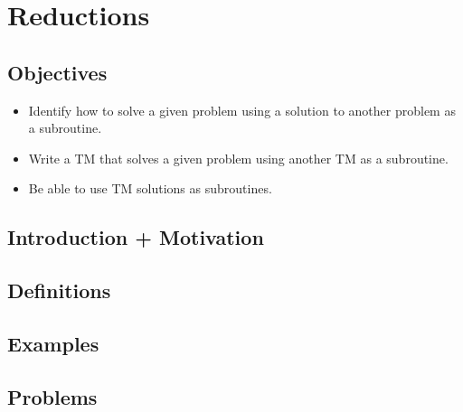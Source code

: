 \chapter{Reductions}

\section{Objectives}

\begin{itemize}
	\item Identify how to solve a given problem using a solution to another problem as a subroutine.
	\item Write a TM that solves a given problem using another TM as a subroutine.
	\item Be able to use TM solutions as subroutines.
\end{itemize}

\section{Introduction + Motivation}

\section{Definitions}

\section{Examples}

\section{Problems}